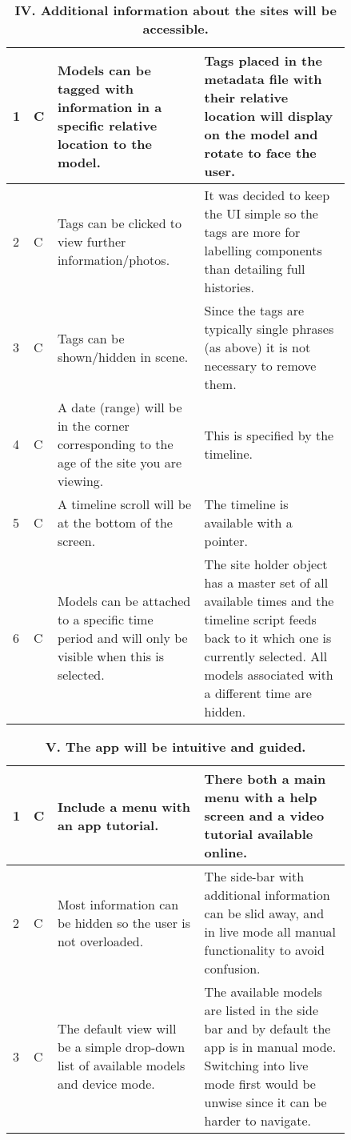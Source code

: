 \documentclass[12pt, a4paper]{article}
\newcommand{\light}[1]{\textcolor{mygrey}{#1}}
\begin{document}
\newpage
\begin{table}[H]
\caption{\textbf{IV. Additional information about the sites will be accessible.}}
\begin{tabular}{| p{0.02\linewidth} | p{0.02\linewidth} | p{0.4\linewidth} | p{0.4\linewidth} | }
\hline
1 & C & \light{Models can be tagged with information in a specific relative location to the model.} & Tags placed in the metadata file with their relative location will display on the model and rotate to face the user. \\ \hline
2 & C & Tags can be clicked to view further information/photos. & It was decided to keep the UI simple so the tags are more for labelling components than detailing full histories. \\ \hline
3 & C & Tags can be shown/hidden in scene. & Since the tags are typically single phrases (as above) it is not necessary to remove them. \\ \hline
4 & C & \light{A date (range) will be in the corner corresponding to the age of the site you are viewing.} & This is specified by the timeline. \\ \hline
5 & C & \light{A timeline scroll will be at the bottom of the screen.} & The timeline is available with a pointer. \\ \hline
6 & C & \light{Models can be attached to a specific time period and will only be visible when this is selected.} & The site holder object has a master set of all available times and the timeline script feeds back to it which one is currently selected. All models associated with a different time are hidden. \\ \hline
\end{tabular}
\label{table:obj4}
\end{table}

\begin{table}[H]
\caption{\textbf{V. The app will be intuitive and guided.}}
\begin{tabular}{| p{0.02\linewidth} | p{0.02\linewidth} | p{0.4\linewidth} | p{0.4\linewidth} | }
\hline
1 & C & \light{Include a menu with an app tutorial.} & There both a main menu with a help screen and a video tutorial available online. \\ \hline
2 & C & \light{Most information can be hidden so the user is not overloaded.} & The side-bar with additional information can be slid away, and in live mode all manual functionality to avoid confusion. \\ \hline
3 & C & \light{The default view will be a simple drop-down list of available models and device mode.} & The available models are listed in the side bar and by default the app is in manual mode. Switching into live mode first would be unwise since it can be harder to navigate. \\ \hline
\end{tabular}
\label{table:obj5}
\end{table}
\end{document}
